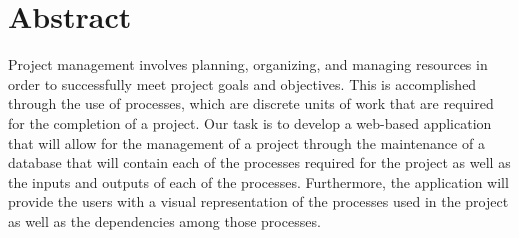 \chapter*{Abstract}
Project management involves planning, organizing, and managing resources in order to successfully meet project goals and objectives. This is accomplished through the use of processes, which are discrete units of work that are required for the completion of a project.
Our task is to develop a web-based application that will allow for the management of a project through the maintenance of a database that will contain each of the processes required for the project as well as the inputs and outputs of each of the processes. Furthermore, the application will provide the users with a visual representation of the processes used in the project as well as the dependencies among those processes.

    
 
